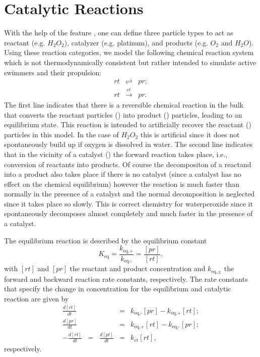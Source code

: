 \section{Catalytic Reactions}
\label{sec:Reactions}

With the help of the feature , one can
define three particle types to act as reactant (e.g. $H_2O_2$), catalyzer (e.g. platinum), and
products (e.g. $O_2$ and $H_2O$). Using these reaction categories, we model the following
chemical reaction system which is not thermodynamically consistent but rather intended to simulate active swimmers and their propulsion:
\begin{eqnarray}
rt & \rightleftharpoons & pr ; \\
rt & \xrightarrow{ct} & pr.
\end{eqnarray}
The first line indicates that there is a reversible chemical
reaction in the bulk that converts the reactant particles () into product
() particles, leading to an equilibrium state. This reaction is intended to artificially recover the reactant () particles in this model. In the case of $H_2O_2$ this is artificial since it does not spontaneously build up if oxygen is dissolved in water. The second line
indicates that in the vicinity of a catalyst () the forward
reaction takes place, i.e., conversion of reactants into
products. Of course the decompositon of a reactand into a product also takes place if there is no catalyst (since a catalyst has no effect on the chemical equilibrium) however the reaction is much faster than normally in the presence of a catalyst and the normal decomposition is neglected since it takes place so slowly. This is correct chemistry for waterperoxide since it spontaneously decomposes almost completely and much faster in the presence of a catalyst.

The equilibrium reaction is described by the equilibrium
constant
\begin{equation}
K_{\text{eq}} = \frac{k_{\text{eq,+}}}{k_{\text{eq,-}}} = \frac{[pr]}{[rt]},
\end{equation}
with $[rt]$ and $[pr]$ the reactant and product concentration and
$k_{\text{eq,$\pm$}}$ the forward and backward reaction rate
constants, respectively. The rate constants that specify the change in
concentration for the equilibrium and catalytic reaction are given by
\begin{eqnarray}
\frac{d[rt]}{dt} & = & k_{\text{eq,-}}[pr] - k_{\text{eq,+}}[rt] ; \\
\frac{d[pr]}{dt} & = & k_{\text{eq,+}}[rt] - k_{\text{eq,-}}[pr] ; \\
-\frac{d[rt]}{dt} \;\; = \;\; \frac{d[pt]}{dt} & = & k_{\text{ct}}[rt] ,
\end{eqnarray}
respectively.

